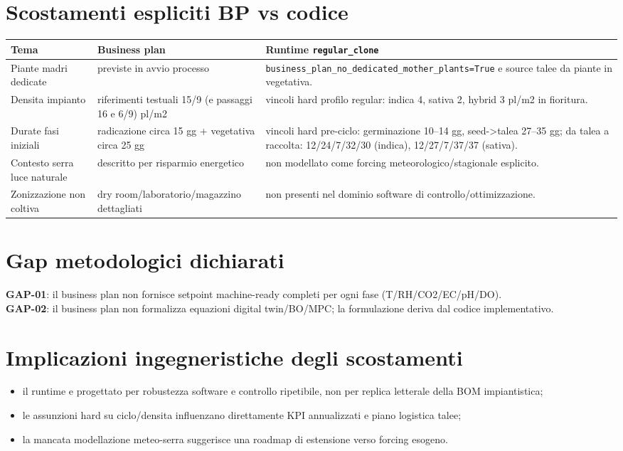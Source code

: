 ﻿\documentclass[11pt,a4paper]{report}
\begin{document}
\section{Scostamenti espliciti BP vs codice}
\begin{longtable}{@{}p{3.4cm}p{5.0cm}p{5.0cm}@{}}
\toprule
Tema & Business plan & Runtime \texttt{regular\_clone} \\ \midrule
Piante madri dedicate & previste in avvio processo & \texttt{business\_plan\_no\_dedicated\_mother\_plants=True} e source talee da piante in vegetativa. \\
Densita impianto & riferimenti testuali 15/9 (e passaggi 16 e 6/9) pl/m2 & vincoli hard profilo regular: indica 4, sativa 2, hybrid 3 pl/m2 in fioritura. \\
Durate fasi iniziali & radicazione circa 15 gg + vegetativa circa 25 gg & vincoli hard pre-ciclo: germinazione 10--14 gg, seed->talea 27--35 gg; da talea a raccolta: 12/24/7/32/30 (indica), 12/27/7/37/37 (sativa). \\
Contesto serra luce naturale & descritto per risparmio energetico & non modellato come forcing meteorologico/stagionale esplicito. \\
Zonizzazione non coltiva & dry room/laboratorio/magazzino dettagliati & non presenti nel dominio software di controllo/ottimizzazione. \\
\bottomrule
\end{longtable}

\section{Gap metodologici dichiarati}
\textbf{GAP-01}: il business plan non fornisce setpoint machine-ready completi per ogni fase (T/RH/CO2/EC/pH/DO).\\
\textbf{GAP-02}: il business plan non formalizza equazioni digital twin/BO/MPC; la formulazione deriva dal codice implementativo.

\section{Implicazioni ingegneristiche degli scostamenti}
\begin{itemize}
  \item il runtime e progettato per robustezza software e controllo ripetibile, non per replica letterale della BOM impiantistica;
  \item le assunzioni hard su ciclo/densita influenzano direttamente KPI annualizzati e piano logistica talee;
  \item la mancata modellazione meteo-serra suggerisce una roadmap di estensione verso forcing esogeno.
\end{itemize}
\end{document}
